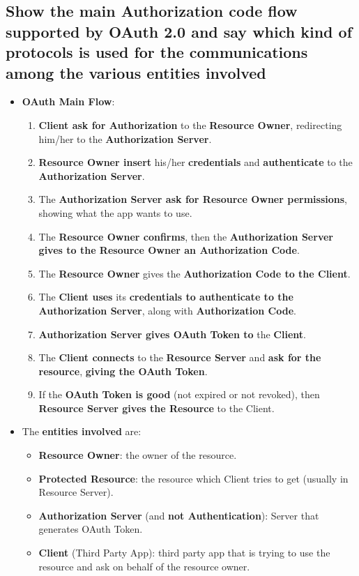 \documentclass[9pt, letterpaper]{article}
\begin{document}
\subsection{Show the main Authorization code flow supported by OAuth 2.0 and say which kind of protocols is used for the communications among the various entities involved}
\begin{itemize}
	\item \textbf{OAuth Main Flow}:
	\begin{enumerate}
		\item \textbf{Client ask for Authorization} to the \textbf{Resource Owner}, redirecting him/her to the \textbf{Authorization Server}.
		\item \textbf{Resource Owner insert} his/her \textbf{credentials} and \textbf{authenticate} to the \textbf{Authorization Server}.
		\item The \textbf{Authorization Server ask for Resource Owner permissions}, showing what the app wants to use.
		\item The \textbf{Resource Owner confirms}, then the \textbf{Authorization Server gives to the Resource Owner an Authorization Code}.
		\item The \textbf{Resource Owner} gives the \textbf{Authorization Code to the Client}.
		\item The \textbf{Client uses} its \textbf{credentials to authenticate to the Authorization Server}, along with \textbf{Authorization Code}.
		\item \textbf{Authorization Server gives OAuth Token to} the \textbf{Client}.
		\item The \textbf{Client connects} to the \textbf{Resource Server} and \textbf{ask for the resource}, \textbf{giving the OAuth Token}.
		\item If the \textbf{OAuth Token is good} (not expired or not revoked), then \textbf{Resource Server gives the Resource} to the Client.
	\end{enumerate}
	\item The \textbf{entities involved} are:
	\begin{itemize}
		\item \textbf{Resource Owner}: the owner of the resource.
		\item \textbf{Protected Resource}: the resource which Client tries to get (usually in Resource Server).
		\item \textbf{Authorization Server} (and \textbf{not Authentication}): Server that generates OAuth Token.
		\item \textbf{Client} (Third Party App): third party app that is trying to use the resource and ask on behalf of the resource owner.

\end{itemize}
\end{itemize}
\end{document}
